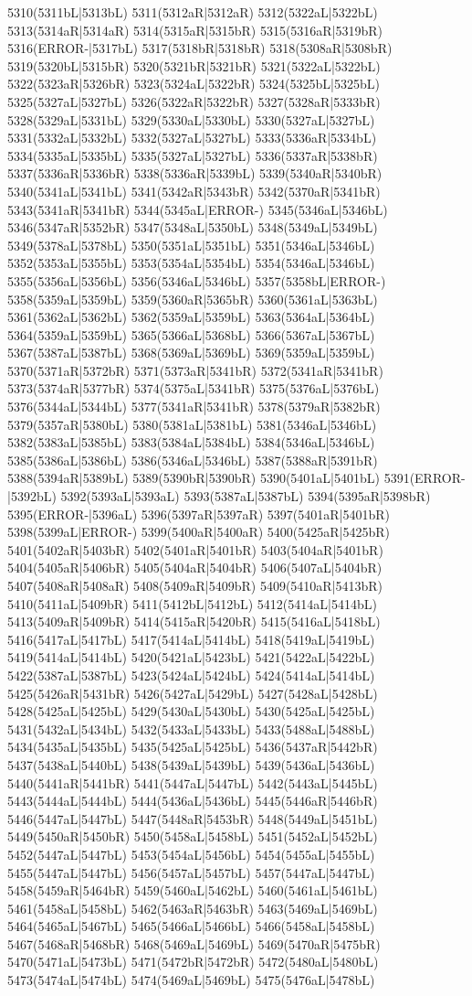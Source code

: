 5310(5311bL|5313bL) 5311(5312aR|5312aR) 5312(5322aL|5322bL) 5313(5314aR|5314aR) 5314(5315aR|5315bR) 5315(5316aR|5319bR) 5316(ERROR-|5317bL) 5317(5318bR|5318bR) 5318(5308aR|5308bR) 5319(5320bL|5315bR) 5320(5321bR|5321bR) 5321(5322aL|5322bL) 5322(5323aR|5326bR) 5323(5324aL|5322bR) 5324(5325bL|5325bL) 5325(5327aL|5327bL) 5326(5322aR|5322bR) 5327(5328aR|5333bR) 5328(5329aL|5331bL) 5329(5330aL|5330bL) 5330(5327aL|5327bL) 5331(5332aL|5332bL) 5332(5327aL|5327bL) 5333(5336aR|5334bL) 5334(5335aL|5335bL) 5335(5327aL|5327bL) 5336(5337aR|5338bR) 5337(5336aR|5336bR) 5338(5336aR|5339bL) 5339(5340aR|5340bR) 5340(5341aL|5341bL) 5341(5342aR|5343bR) 5342(5370aR|5341bR) 5343(5341aR|5341bR) 5344(5345aL|ERROR-) 5345(5346aL|5346bL) 5346(5347aR|5352bR) 5347(5348aL|5350bL) 5348(5349aL|5349bL) 5349(5378aL|5378bL) 5350(5351aL|5351bL) 5351(5346aL|5346bL) 5352(5353aL|5355bL) 5353(5354aL|5354bL) 5354(5346aL|5346bL) 5355(5356aL|5356bL) 5356(5346aL|5346bL) 5357(5358bL|ERROR-) 5358(5359aL|5359bL) 5359(5360aR|5365bR) 5360(5361aL|5363bL) 5361(5362aL|5362bL) 5362(5359aL|5359bL) 5363(5364aL|5364bL) 5364(5359aL|5359bL) 5365(5366aL|5368bL) 5366(5367aL|5367bL) 5367(5387aL|5387bL) 5368(5369aL|5369bL) 5369(5359aL|5359bL) 5370(5371aR|5372bR) 5371(5373aR|5341bR) 5372(5341aR|5341bR) 5373(5374aR|5377bR) 5374(5375aL|5341bR) 5375(5376aL|5376bL) 5376(5344aL|5344bL) 5377(5341aR|5341bR) 5378(5379aR|5382bR) 5379(5357aR|5380bL) 5380(5381aL|5381bL) 5381(5346aL|5346bL) 5382(5383aL|5385bL) 5383(5384aL|5384bL) 5384(5346aL|5346bL) 5385(5386aL|5386bL) 5386(5346aL|5346bL) 5387(5388aR|5391bR) 5388(5394aR|5389bL) 5389(5390bR|5390bR) 5390(5401aL|5401bL) 5391(ERROR-|5392bL) 5392(5393aL|5393aL) 5393(5387aL|5387bL) 5394(5395aR|5398bR) 5395(ERROR-|5396aL) 5396(5397aR|5397aR) 5397(5401aR|5401bR) 5398(5399aL|ERROR-) 5399(5400aR|5400aR) 5400(5425aR|5425bR) 5401(5402aR|5403bR) 5402(5401aR|5401bR) 5403(5404aR|5401bR) 5404(5405aR|5406bR) 5405(5404aR|5404bR) 5406(5407aL|5404bR) 5407(5408aR|5408aR) 5408(5409aR|5409bR) 5409(5410aR|5413bR) 5410(5411aL|5409bR) 5411(5412bL|5412bL) 5412(5414aL|5414bL) 5413(5409aR|5409bR) 5414(5415aR|5420bR) 5415(5416aL|5418bL) 5416(5417aL|5417bL) 5417(5414aL|5414bL) 5418(5419aL|5419bL) 5419(5414aL|5414bL) 5420(5421aL|5423bL) 5421(5422aL|5422bL) 5422(5387aL|5387bL) 5423(5424aL|5424bL) 5424(5414aL|5414bL) 5425(5426aR|5431bR) 5426(5427aL|5429bL) 5427(5428aL|5428bL) 5428(5425aL|5425bL) 5429(5430aL|5430bL) 5430(5425aL|5425bL) 5431(5432aL|5434bL) 5432(5433aL|5433bL) 5433(5488aL|5488bL) 5434(5435aL|5435bL) 5435(5425aL|5425bL) 5436(5437aR|5442bR) 5437(5438aL|5440bL) 5438(5439aL|5439bL) 5439(5436aL|5436bL) 5440(5441aR|5441bR) 5441(5447aL|5447bL) 5442(5443aL|5445bL) 5443(5444aL|5444bL) 5444(5436aL|5436bL) 5445(5446aR|5446bR) 5446(5447aL|5447bL) 5447(5448aR|5453bR) 5448(5449aL|5451bL) 5449(5450aR|5450bR) 5450(5458aL|5458bL) 5451(5452aL|5452bL) 5452(5447aL|5447bL) 5453(5454aL|5456bL) 5454(5455aL|5455bL) 5455(5447aL|5447bL) 5456(5457aL|5457bL) 5457(5447aL|5447bL) 5458(5459aR|5464bR) 5459(5460aL|5462bL) 5460(5461aL|5461bL) 5461(5458aL|5458bL) 5462(5463aR|5463bR) 5463(5469aL|5469bL) 5464(5465aL|5467bL) 5465(5466aL|5466bL) 5466(5458aL|5458bL) 5467(5468aR|5468bR) 5468(5469aL|5469bL) 5469(5470aR|5475bR) 5470(5471aL|5473bL) 5471(5472bR|5472bR) 5472(5480aL|5480bL) 5473(5474aL|5474bL) 5474(5469aL|5469bL) 5475(5476aL|5478bL) 